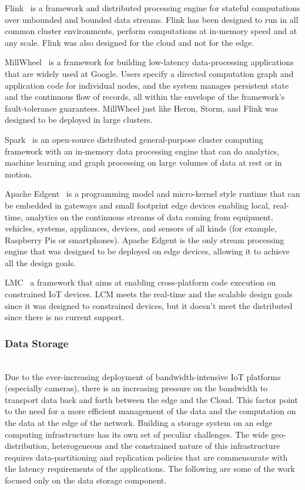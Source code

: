 Flink~\cite{flink}  is a framework and distributed processing engine for stateful computations over unbounded and bounded data streams. Flink has been designed to run in all common cluster environments, perform computations at in-memory speed and at any scale. Flink was also designed for the cloud and not for the edge.

MillWheel~\cite{millwheel} is a framework for building low-latency data-processing applications that are widely used at Google. Users specify a directed computation graph and application code for individual nodes, and the system manages persistent state and the continuous flow of records, all within the envelope of the framework's fault-tolerance guarantees. MillWheel just like Heron, Storm, and Flink was designed to be deployed in large clusters.

Spark~\cite{spark} is an open-source distributed general-purpose cluster computing framework with an in-memory data processing engine that can do analytics, machine learning and graph processing on large volumes of data at rest or in motion.

Apache Edgent~\cite{edgent} is a programming model and micro-kernel style runtime that can be embedded in gateways and small footprint edge devices enabling local, real-time, analytics on the continuous streams of data coming from equipment, vehicles, systems, appliances, devices, and sensors of all kinds (for example, Raspberry Pis or smartphones). Apache Edgent is the only stream processing engine that was designed to be deployed on edge devices, allowing it to achieve all the design goals.

LMC~\cite{8102173} a framework that aims at enabling cross-platform code execution on constrained IoT devices. LCM meets the real-time and the scalable design goals since it was designed to constrained devices, but it doesn't meet the distributed since there is no current support.

\subsubsection{Data Storage}
\hfill\\
Due to the ever-increasing deployment of bandwidth-intensive IoT platforms (especially cameras), there is an increasing pressure on the bandwidth to transport data back and forth between the edge and the Cloud. This factor point to the need for a more efficient management of the data and the computation on the data at the edge of the network. Building a storage system on an edge computing infrastructure has its own set of peculiar challenges. The wide geo-distribution, heterogeneous and the constrained nature of this
infrastructure requires data-partitioning and replication policies that are commensurate with the latency requirements of the applications. The following are some of the work focused only on the data storage component.

